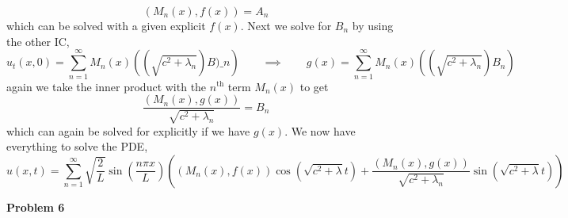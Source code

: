\documentclass[10pt]{article}
\begin{document}
$$\left(M_{n}(x),f(x)\right) = A_{n}$$
which can be solved with a given explicit $f(x)$. Next we solve for $B_{n}$ by using the other IC,
$$u_{t}(x,0) = \sum_{n=1}^{\infty}M_{n}(x)\left((\sqrt{c^{2} + \lambda_{n}})B)\_{n}\right) \hspace{2em} \implies \hspace{2em}g(x) = \sum_{n=1}^{\infty}M_{n}(x)\left((\sqrt{c^{2} + \lambda_{n}})B_{n}\right)$$
again we take the inner product with the $n^{\text{th}}$ term $M_{n}(x)$ to get
$$\frac{\left(M_{n}(x), g(x)\right)}{\sqrt{c^{2} + \lambda_{n}}} = B_{n}$$
which can again be solved for explicitly if we have $g(x)$. We now have everything to solve the PDE,
$$u(x,t) = \sum_{n=1}^{\infty}\sqrt{\frac{2}{L}}\sin\left(\frac{n\pi x}{L}\right)\left(\left(M_{n}(x),f(x)\right)\cos\left(\sqrt{c^{2} + \lambda}t\right) + \frac{\left(M_{n}(x), g(x)\right)}{\sqrt{c^{2} + \lambda_{n}}}\sin\left(\sqrt{c^{2} + \lambda}t\right)\right)$$

\newpage
\textbf{Problem 6}
\end{document}
